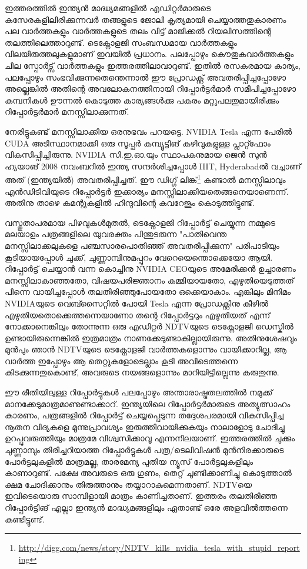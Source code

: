 ഇത്തരത്തില്‍ ഇന്ത്യന്‍ മാദ്ധ്യമങ്ങളില്‍ എഡിറ്റര്‍മാരുടെ കസേരകളിലിരിക്കുന്നവര്‍ തങ്ങളുടെ ജോലി കൃത്യമായി 
ചെയ്യാത്തതുകാരണം പല വാര്‍ത്തകളും വാര്‍ത്തകളുടെ തലം വിട്ട് മാജിക്കല്‍ റിയലിസത്തിന്റെ തലത്തിലെത്താറുണ്ട്. 
ടെക്നോളജി സംബന്ധമായ വാര്‍ത്തകളും വിലയിരുത്തലുകളുമാണ് ഇവയില്‍ പ്രധാനം. പലപ്പോഴും കൌതുകവാര്‍ത്തകളും 
ചില സ്പോര്‍ട്സ് വാര്‍ത്തകളും ഇത്തരത്തിലാവാറുണ്ട്. ഇതില്‍ രസകരമായ കാര്യം, പലപ്പോഴും 
സംഭവിക്കുന്നതെന്തെന്നാല്‍ ഈ പ്രോഡക്റ്റ് അവതരിപ്പിച്ചപ്പോഴോ അല്ലെങ്കില്‍ അതിന്റെ അവലോകനത്തിനായി 
റിപ്പോര്‍ട്ടര്‍മാര്‍ സമീപിച്ചപ്പോഴോ കമ്പനികള്‍ ഊന്നല്‍ കൊടുത്ത കാര്യങ്ങള്‍ക്കു പകരം മറ്റുപലതുമായിരിക്കും 
റിപ്പോര്‍ട്ടര്‍മാര്‍ മനസ്സിലാക്കുന്നത്.

നേരിട്ടുകണ്ട് മനസ്സിലാക്കിയ ഒരനുഭവം പറയട്ടെ. NVIDIA Tesla എന്ന പേരില്‍ CUDA അടിസ്ഥാനമാക്കി ഒരു 
സൂപ്പര്‍ കമ്പ്യൂട്ടിങ് കഴിവുകളുള്ള പ്ലാറ്റ്ഫോം വികസിപ്പിച്ചിരുന്നു. NVIDIA സി.ഇ.ഓ.യും സ്ഥാപകനുമായ ജെന്‍ സുന്‍ 
ഹ്യയാങ് 2008 നവംബറില്‍ ഇന്ത്യ സന്ദര്‍ശിച്ചപ്പോള്‍ IIIT, Hyderabadല്‍ വച്ചാണ് അത് (ഇന്ത്യയില്‍) 
അവതരിപ്പിച്ചത്. ഈ ഡിഗ്ഗ് 
ലിങ്ക്\footnote{\url{http://digg.com/news/story/NDTV_kills_nvidia_tesla_with_stupid_reporting}}
കണ്ടാല്‍ മനസ്സിലാവും എന്‍ഡിടിവിയുടെ റിപ്പോര്‍ട്ടര്‍ ഇക്കാര്യം 
മനസ്സിലാക്കിയതെങ്ങനെയാണെന്ന്. അതിനു താഴെ കമന്റുകളില്‍ ഹിന്ദുവിന്റെ കവറേജും കൊടുത്തിട്ടുണ്ട്.

വസ്തുതാപരമായ പിഴവുകള്‍മുതല്‍, ടെക്നോളജി റിപ്പോര്‍ട്ട് ചെയ്യുന്ന നമ്മുടെ മലയാളം പത്രങ്ങളിലെ യുവരക്തം 
പിന്തുടരുന്ന "പാതിവെന്ത മനസ്സിലാക്കലുകളെ പഞ്ചസാരപൊതിഞ്ഞ് അവതരിപ്പിക്കുന്ന" പരിപാടിയും കൂടിയായപ്പോള്‍ 
ചുക്ക്, ചുണ്ണാമ്പിനുമപ്പുറം വേറെയെന്തൊക്കെയോ ആയി. റിപ്പോര്‍ട്ട് ചെയ്യാന്‍ വന്ന കൊച്ചിനു NVIDIA CEOയുടെ 
അമേരിക്കന്‍ ഉച്ചാരണം മനസ്സിലാകാഞ്ഞതോ, വിഷയപരിജ്ഞാനം കമ്മിയായതോ, എഴുതിയെടുത്തത് പിന്നെ 
വായിച്ചപ്പോള്‍ തലതിരിഞ്ഞുപോയതോ ഒക്കെയാകാം. എങ്കിലും മിനിമം NVIDIAയുടെ വെബ്സൈറ്റില്‍ പോയി Tesla 
എന്ന പ്രോഡക്റ്റിനു കീഴില്‍ എഴുതിയതൊക്കെത്തന്നെയാണോ തന്റെ റിപ്പോര്‍ട്ടറും എഴുതിയത് എന്ന് നോക്കാനെങ്കിലും 
തോന്നുന്ന ഒരു എഡിറ്റര്‍ NDTVയുടെ ടെക്നോളജി ഡെസ്കില്‍ ഉണ്ടായിരുന്നെങ്കില്‍ ഇത്രമാത്രം 
നാണക്കേടുണ്ടാകില്ലായിരുന്നു. അതിനുശേഷവും മുന്‍പും ഞാന്‍ NDTVയുടെ ടെക്നോളജി വാര്‍ത്തകളൊന്നും വായിക്കാറില്ല, 
ആ വാര്‍ത്ത ഇപ്പോഴും ആ തെറ്റുകളോടെല്ലാം കൂടി അവിടെത്തന്നെ കിടക്കുന്നതുകൊണ്ട്, അവരുടെ നയങ്ങളൊന്നും 
മാറിയിട്ടില്ലെന്നു കരുതുന്നു.

ഈ രീതിയിലുള്ള റിപ്പോര്‍ട്ടുകള്‍ പലപ്പോഴും അന്താരാഷ്ട്രതലത്തില്‍ നമുക്ക് മാനക്കേടുമാത്രമാണുണ്ടാക്കാറ്. ഇന്ത്യയിലെ 
റിപ്പോര്‍ട്ടര്‍മാരുടെ അത്യുത്സാഹം കാരണം, പത്രങ്ങളില്‍ റിപ്പോര്‍ട്ട് ചെയ്യപ്പെടുന്ന തദ്ദേശപരമായി വികസിപ്പിച്ച നൂതന 
വിദ്യകളെ മൂന്നുപ്രാവശ്യം ഇരുത്തിവായിക്കുകയും നാലാളോടു ചോദിച്ചു ഉറപ്പുവരുത്തിയും മാത്രമേ വിശ്വസിക്കാവൂ 
എന്നനിലയാണ്. ഇത്തരത്തില്‍ ചുക്കും ചുണ്ണാമ്പും തിരിച്ചറിയാത്ത റിപ്പോര്‍ട്ടുകള്‍ പത്ര/ടെലിവിഷന്‍ മുന്‍നിരക്കാരുടെ 
പോര്‍ട്ടലുകളില്‍ മാത്രമല്ല, താരമേന്യ പുതിയ ന്യൂസ് പോര്‍ട്ടലുകളിലും കാണാറുണ്ട്. പക്ഷേ അവരുടെ ഒരു ഗുണം, തെറ്റ് 
ചൂണ്ടിക്കാണിച്ചു കൊടുത്താല്‍ ക്ഷമ ചോദിക്കാനും തിരുത്താനും തയ്യാറാകുമെന്നതാണ്. NDTVയെ ഇവിടെയൊരു 
സാമ്പിളായി മാത്രം കാണിച്ചതാണ്. ഇത്തരം തലതിരിഞ്ഞ റിപ്പോര്‍ട്ടിങ് എല്ലാ ഇന്ത്യന്‍ മാദ്ധ്യമങ്ങളിലും ഏതാണ്ട് ഒരേ 
അളവില്‍ത്തന്നെ കണ്ടിട്ടുണ്ട്.

